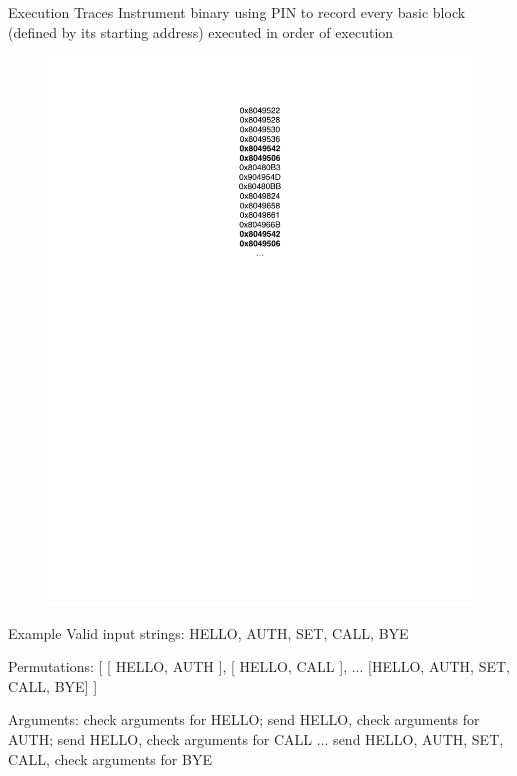 \documentclass[pdf]{beamer}
\begin{document}
\begin{frame}{Execution Traces}
Instrument binary using PIN to record every basic block (defined by its starting address) executed in order of execution
\begin{figure}
\begin{center}
\includegraphics[scale=0.5]{../paper/traceexample.pdf}
\end{center}
\end{figure}
\end{frame}

\begin{frame}{Example}
Valid input strings: HELLO, AUTH, SET, CALL, BYE

Permutations: [ [ HELLO, AUTH ], [ HELLO, CALL ], ... [HELLO, AUTH, SET, CALL, BYE] ]

Arguments: check arguments for HELLO; send HELLO, check arguments for AUTH; send HELLO, check arguments for CALL ... send HELLO, AUTH, SET, CALL, check arguments for BYE

\end{frame}
\end{document}
